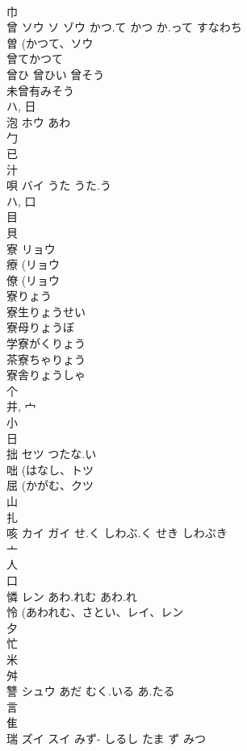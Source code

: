 \documentclass[8pt]{extreport}
\begin{document}
\begin{CJK}{UTF8}{min}
\\	巾 
\\	曾	ソウ ソ ゾウ	かつ.て かつ か.って すなわち	
\\	曽 (かつて、ソウ 
\\	曾てかつて 
\\	曾ひ 曾ひい 曾そう 
\\	未曾有みそう 
\\	ハ, 日 
\\	泡	ホウ	あわ	
\\	勹 
\\	已 
\\	汁 
\\	唄	バイ	うた うた.う	
\\	ハ, 口 
\\	目 
\\	貝 
\\	寮	リョウ		
\\	療 (リョウ 
\\	僚 (リョウ 
\\	寮りょう
\\	寮生りょうせい
\\	寮母りょうぼ
\\	学寮がくりょう
\\	茶寮ちゃりょう
\\	寮舎りょうしゃ
\\	个 
\\	并, 宀 
\\	小 
\\	日 
\\	拙	セツ	つたな.い	
\\	咄 (はなし、トツ 
\\	屈 (かがむ、クツ 
\\	山 
\\	扎	
\\	咳	カイ ガイ	せ.く しわぶ.く せき しわぶき	
\\	亠 
\\	人 
\\	口 
\\	憐	レン	あわ.れむ あわ.れ	
\\	怜 (あわれむ、さとい、レイ、レン 
\\	夕 
\\	忙 
\\	米 
\\	舛 
\\	讐	シュウ	あだ むく.いる あ.たる	
\\	言 
\\	隹 
\\	瑞	ズイ スイ	みず- しるし たま ず みつ	

\end{CJK}
\end{document}
